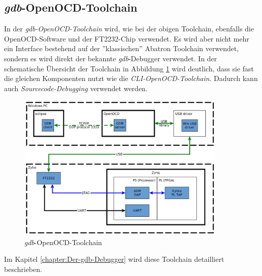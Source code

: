 \FloatBarrier
\subsection{\textit{gdb}-OpenOCD-Toolchain}
In der \textit{gdb-OpenOCD-Toolchain} wird, wie bei der obigen Toolchain, ebenfalls die OpenOCD-Software und der FT2232-Chip verwendet.
Es wird aber nicht mehr ein Interface bestehend auf der ''klassischen'' Abatron Toolchain verwendet, sondern es wird direkt der bekannte \textit{gdb}-Debugger verwendet.
In der schematische Übersicht der Toolchain in Abbildung \ref{fig:gdbOpenOCDToolchain} wird deutlich, dass sie fast die gleichen Komponenten nutzt wie die \textit{CLI-OpenOCD-Toolchain}.
Dadurch kann auch \textit{Sourcecode-Debugging} verwendet werden.

\begin{figure}[htbp]
	\centering
		\includegraphics[width=10cm,height=\textheight,keepaspectratio]{graphs/gdbOpenOCDToolchain.png}
	\caption{\textit{gdb}-OpenOCD-Toolchain}
	\label{fig:gdbOpenOCDToolchain}
\end{figure}

Im Kapitel \ref{chapter:Der-gdb-Debugger} wird diese Toolchain detailliert beschrieben.
